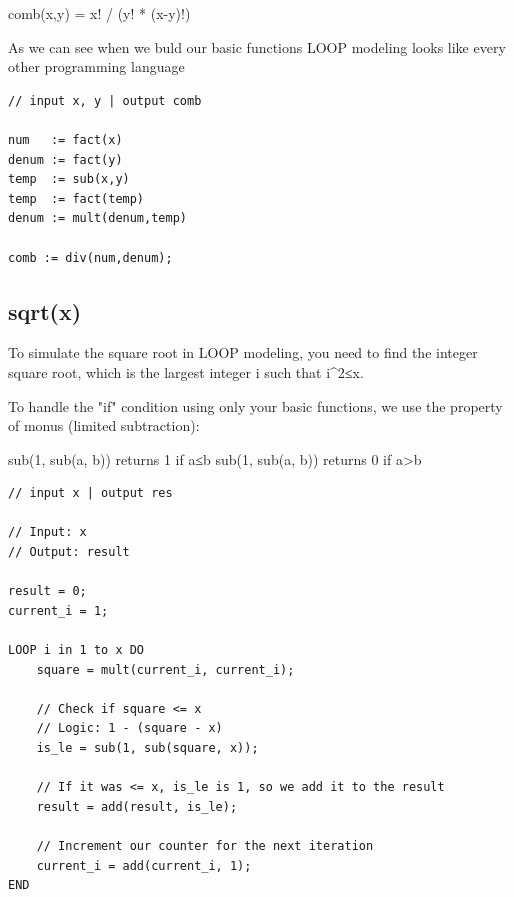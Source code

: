 \documentclass[11pt,a4paper]{article}
\begin{document}
comb(x,y) = x! / (y! * (x-y)!)

As we can see when we buld our basic functions LOOP modeling looks like every other programming language

\begin{lstlisting}
// input x, y | output comb

num   := fact(x)
denum := fact(y)
temp  := sub(x,y)
temp  := fact(temp)
denum := mult(denum,temp)

comb := div(num,denum);

\end{lstlisting}

\pagebreak

\subsection*{sqrt(x)}
To simulate the square root in LOOP modeling, you need to find the integer square root, 
which is the largest integer i such that i^2≤x.

To handle the "if" condition using only your basic functions, we use the property of monus (limited subtraction):

sub(1, sub(a, b)) returns 1 if a≤b
sub(1, sub(a, b)) returns 0 if a>b

\begin{lstlisting}
// input x | output res

// Input: x
// Output: result

result = 0;
current_i = 1;

LOOP i in 1 to x DO
    square = mult(current_i, current_i);
    
    // Check if square <= x
    // Logic: 1 - (square - x)
    is_le = sub(1, sub(square, x));
    
    // If it was <= x, is_le is 1, so we add it to the result
    result = add(result, is_le);
    
    // Increment our counter for the next iteration
    current_i = add(current_i, 1);
END

\end{lstlisting}
\end{document}
